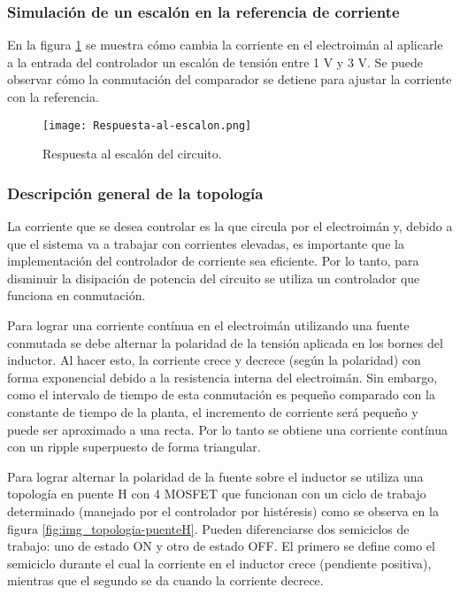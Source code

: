 \subsubsection{Simulación de un escalón en la referencia de corriente}

\noindent En la figura \ref{fig:img_respuesta-al-escalon} se muestra cómo cambia la corriente en el electroimán al aplicarle a la entrada del controlador un escalón de tensión entre 1 V y 3 V. Se puede observar cómo la conmutación del comparador se detiene para ajustar la corriente con la referencia.

\begin{figure}[H]
	\centering
	\texttt{[image: Respuesta-al-escalon.png]}
	\caption{Respuesta al escalón del circuito.}
	\label{fig:img_respuesta-al-escalon}
\end{figure}


\subsubsection{Descripción general de la topología}

\noindent La corriente que se desea controlar es la que circula por el electroimán y, debido a que el sistema va a trabajar con corrientes elevadas, es importante que la implementación del controlador de corriente sea eficiente. Por lo tanto, para disminuir la disipación de potencia del circuito se utiliza un controlador que funciona en conmutación. 

\noindent Para lograr una corriente contínua en el electroimán utilizando una fuente conmutada se debe alternar la polaridad de la tensión aplicada en los bornes del inductor. Al hacer esto, la corriente crece y decrece (según la polaridad) con forma exponencial debido a la resistencia interna del electroimán. Sin embargo, como el intervalo de tiempo de esta conmutación es pequeño comparado con la constante de tiempo de la planta, el incremento de corriente será pequeño y puede ser aproximado a una recta. Por lo tanto se obtiene una corriente contínua con un ripple superpuesto de forma triangular. 

\noindent Para lograr alternar la polaridad de la fuente sobre el inductor se utiliza una topología en puente H con 4 MOSFET que funcionan con un ciclo de trabajo determinado (manejado por el controlador por histéresis) como se observa en la figura \ref{fig:img_topologia-puenteH}. Pueden diferenciarse dos semiciclos de trabajo: uno de estado ON y otro de estado OFF. El primero se define como el semiciclo durante el cual la corriente en el inductor crece (pendiente positiva), mientras que el segundo se da cuando la corriente decrece.

